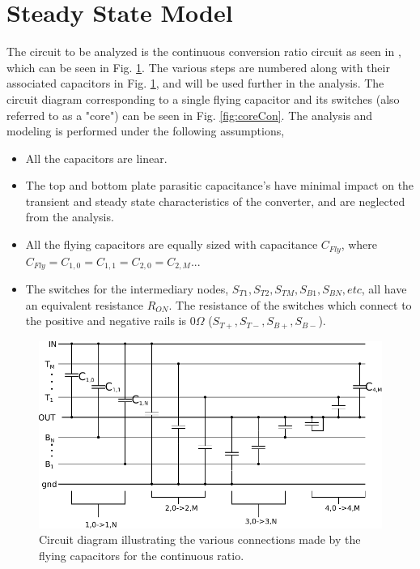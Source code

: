 \documentclass[conference]{IEEEtran}
\begin{document}
	\section{Steady State Model}
	The circuit to be analyzed is the continuous conversion ratio circuit as seen in \cite{Butzen2019}, which can be seen in Fig. \ref{fig:contTop}. The various steps are numbered along with their associated capacitors in Fig. \ref{fig:contTop}, and will be used further in the analysis. The circuit diagram corresponding to a single flying capacitor and its switches (also referred to as a "core") can be seen in Fig. \ref{fig:coreCon}. The analysis and modeling is performed under the following assumptions,
	\begin{itemize}
		\item All the capacitors are linear.
		\item The top and bottom plate parasitic capacitance's have minimal impact on the transient and steady state characteristics of the converter, and are neglected from the analysis.
		\item All the flying capacitors are equally sized with capacitance $C_{Fly}$, where $C_{Fly} = C_{1,0} = C_{1,1} = C_{2,0} = C_{2,M} ...$
		\item The switches for the intermediary nodes, $S_{T1}, S_{T2}, S_{TM}, S_{B1}, S_{BN}, etc$, all have an equivalent resistance $R_{ON}$. The resistance of the switches which connect to the positive and negative rails is 0$\Omega$ ($S_{T+}, S_{T-}, S_{B+}, S_{B-}$).
	\end{itemize}
	\begin{figure}
		\centering
		\includegraphics[width=\linewidth]{Figures/contRatioCircuit2.pdf}
		\caption{Circuit diagram illustrating the various connections made by the flying capacitors for the continuous ratio.}
		\label{fig:contTop}
	\end{figure}
\end{document}
